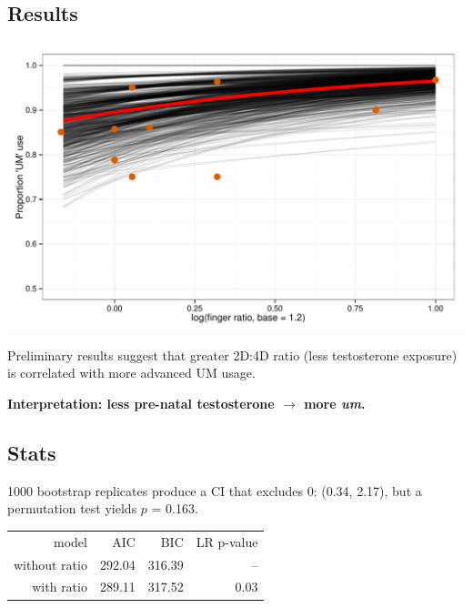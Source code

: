 \documentclass[a0,portrait]{a0poster}
\begin{document}
\begin{multicols}{2}


\section*{Results}

\begin{minipage}[c]{0.70\linewidth}
\includegraphics[width=1\linewidth]{finger_effect.pdf}
\end{minipage}
%
\begin{minipage}[c]{0.25\linewidth}
\large
Preliminary results suggest that greater 2D:4D ratio (less testosterone exposure) is correlated with more advanced UM usage.
\end{minipage}

\begin{center}
\noindent\textbf{Interpretation: less pre-natal testosterone $\rightarrow$ more \textsl{um}.}
\end{center}

\subsection*{Stats}
1000 bootstrap replicates produce a CI that excludes 0: (0.34, 2.17), but a permutation test yields $p$ = 0.163.

\begin{center}
\begin{tabular}{rrrr}
\toprule
	model & AIC & BIC & LR p-value\\
	\cmidrule{2-4}
without ratio & 292.04 & 316.39 & -- \\
with ratio &  289.11 & 317.52 & 0.03\\
\bottomrule
\end{tabular}
\end{center}


\end{multicols}
\end{document}
